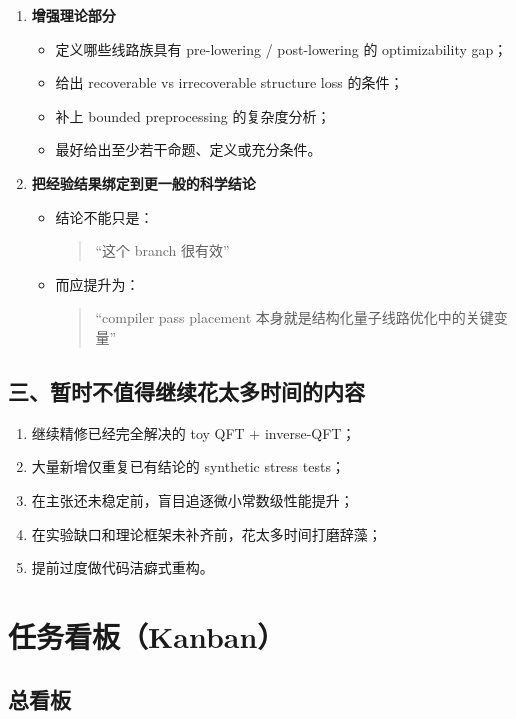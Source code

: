 \documentclass[11pt]{article}
\begin{document}
\begin{enumerate}
    \item \textbf{增强理论部分}
    \begin{itemize}
        \item 定义哪些线路族具有 pre-lowering / post-lowering 的 optimizability gap；
        \item 给出 recoverable vs irrecoverable structure loss 的条件；
        \item 补上 bounded preprocessing 的复杂度分析；
        \item 最好给出至少若干命题、定义或充分条件。
    \end{itemize}

    \item \textbf{把经验结果绑定到更一般的科学结论}
    \begin{itemize}
        \item 结论不能只是：
        \begin{quote}
        “这个 branch 很有效”
        \end{quote}
        \item 而应提升为：
        \begin{quote}
        “compiler pass placement 本身就是结构化量子线路优化中的关键变量”
        \end{quote}
    \end{itemize}
\end{enumerate}

\subsection{三、暂时不值得继续花太多时间的内容}

\begin{enumerate}
    \item 继续精修已经完全解决的 toy QFT + inverse-QFT；
    \item 大量新增仅重复已有结论的 synthetic stress tests；
    \item 在主张还未稳定前，盲目追逐微小常数级性能提升；
    \item 在实验缺口和理论框架未补齐前，花太多时间打磨辞藻；
    \item 提前过度做代码洁癖式重构。
\end{enumerate}

\section{任务看板（Kanban）}

\subsection{总看板}
\end{document}
